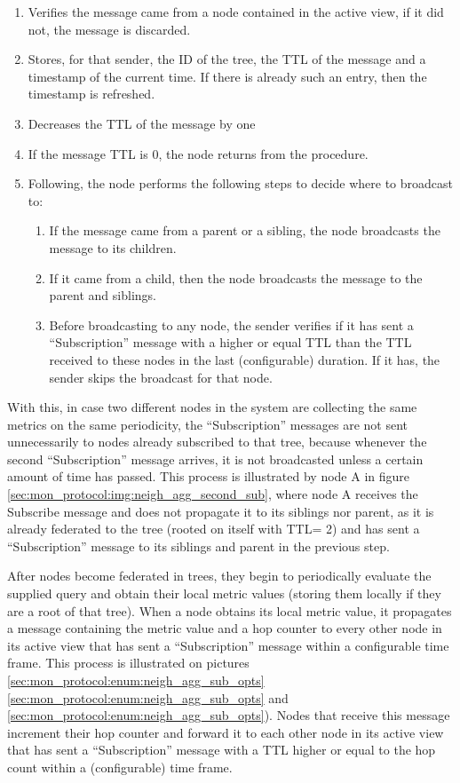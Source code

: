 \begin{enumerate} \label{sec:mon_protocol:enum:neigh_agg_sub_opts}
    \item Verifies the message came from a node contained in the active view, if it did not, the message is discarded.
    \item Stores, for that sender, the ID of the tree, the TTL of the message and a timestamp of the current time. If there is already such an entry, then the timestamp is refreshed.
    \item Decreases the TTL of the message by one
    \item If the message TTL is 0, the node returns from the procedure.
    \item Following, the node performs the following steps to decide where to broadcast to:
            \begin{enumerate}
                \item If the message came from a parent or a sibling, the node broadcasts the message to its children.
                \item If it came from a child, then the node broadcasts the message to the parent and siblings.
                \item Before broadcasting to any node, the sender verifies if it has sent a ``Subscription'' message with a higher or equal TTL than the TTL received to these nodes in the last (configurable) duration. If it has, the sender skips the broadcast for that node.
            \end{enumerate}
\end{enumerate}

With this, in case two different nodes in the system are collecting the same metrics on the same periodicity, the ``Subscription'' messages are not sent unnecessarily to nodes already subscribed to that tree, because whenever the second ``Subscription'' message arrives, it is not broadcasted unless a certain amount of time has passed. This process is illustrated by node A in figure \ref{sec:mon_protocol:img:neigh_agg_second_sub}, where node A receives the Subscribe message and does not propagate it to its siblings nor parent, as it is already federated to the tree (rooted on itself with TTL= 2) and has sent a ``Subscription'' message to its siblings and parent in the previous step.

After nodes become federated in trees, they begin to periodically evaluate the supplied query and obtain their local metric values (storing them locally if they are a root of that tree). When a node obtains its local metric value, it propagates a message containing the metric value and a hop counter to every other node in its active view that has sent a ``Subscription'' message within a configurable time frame. This process is illustrated on pictures \ref{sec:mon_protocol:enum:neigh_agg_sub_opts} \ref{sec:mon_protocol:enum:neigh_agg_sub_opts} and \ref{sec:mon_protocol:enum:neigh_agg_sub_opts}). Nodes that receive this message increment their hop counter and forward it to each other node in its active view that has sent a ``Subscription'' message with a TTL higher or equal to the hop count within a (configurable) time frame.

